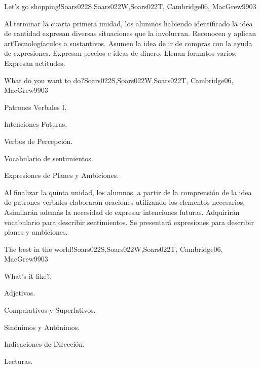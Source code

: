 \begin{syllabus}
\begin{unit}{Let's go shopping!}{Soars022S,Soars022W,Soars022T, Cambridge06, MacGrew99}{0}{3}
   \begin{unitgoals}
      \item Al terminar la cuarta primera unidad, los alumnos habiendo identificado la idea de cantidad expresan diversas situaciones que la involucran. Reconocen y aplican artTecnologíaculos a sustantivos. Asumen la idea de ir de compras con la ayuda de expresiones. Expresan precios e ideas de dinero. Llenan formatos varios. Expresan actitudes.
   \end{unitgoals}

\end{unit}

\begin{unit}{What do you want to do?}{Soars022S,Soars022W,Soars022T, Cambridge06, MacGrew99}{0}{3}
   \begin{topics}
      \item Patrones Verbales I.
      \item Intenciones Futuras.
      \item Verbos de Percepción.
      \item Vocabulario de sentimientos.
      \item Expresiones de Planes y Ambiciones.
   \end{topics}

   \begin{unitgoals}
      \item Al finalizar la quinta unidad, los alumnos, a partir de la comprensión de la idea de patrones verbales elaborarán oraciones utilizando los elementos necesarios. Asimilarán además la necesidad de expresar intenciones futuras. Adquirirán vocabulario para describir sentimientos. Se presentará expresiones para describir planes y ambiciones.
   \end{unitgoals}
\end{unit}

\begin{unit}{The best in the world!}{Soars022S,Soars022W,Soars022T, Cambridge06, MacGrew99}{0}{3}
   \begin{topics}
      \item What's it like?.
      \item Adjetivos.
      \item Comparativos y Superlativos.
      \item Sinónimos y Antónimos. 
      \item Indicaciones de Dirección.
      \item Lecturas.
   \end{topics}


\end{unit}
\end{syllabus}
